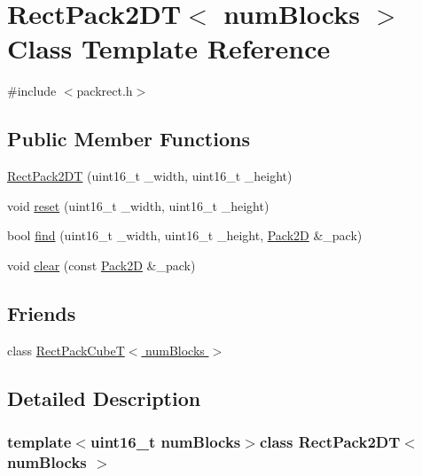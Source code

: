 \hypertarget{class_rect_pack2_d_t}{\section{Rect\+Pack2\+D\+T$<$ num\+Blocks $>$ Class Template Reference}
\label{class_rect_pack2_d_t}
}


{\ttfamily \#include $<$packrect.\+h$>$}

\subsection*{Public Member Functions}
\begin{DoxyCompactItemize}
\item 
\hyperlink{class_rect_pack2_d_t_a475fb57d65c318626bb51fbd9dcc20dc}{Rect\+Pack2\+D\+T} (uint16\+\_\+t \+\_\+width, uint16\+\_\+t \+\_\+height)
\item 
void \hyperlink{class_rect_pack2_d_t_aac0ac0b9631bcbf3f2a10e8c7cf8ab12}{reset} (uint16\+\_\+t \+\_\+width, uint16\+\_\+t \+\_\+height)
\item 
bool \hyperlink{class_rect_pack2_d_t_a47450b481e3b9fc57b978f8aba4e9dca}{find} (uint16\+\_\+t \+\_\+width, uint16\+\_\+t \+\_\+height, \hyperlink{struct_pack2_d}{Pack2\+D} \&\+\_\+pack)
\item 
void \hyperlink{class_rect_pack2_d_t_aedff115b84ad02b97c26c1ceb492886a}{clear} (const \hyperlink{struct_pack2_d}{Pack2\+D} \&\+\_\+pack)
\end{DoxyCompactItemize}
\subsection*{Friends}
\begin{DoxyCompactItemize}
\item 
class \hyperlink{class_rect_pack2_d_t_ac2d4e1c14e02415a4da39a73bbdebc69}{Rect\+Pack\+Cube\+T$<$ num\+Blocks $>$}
\end{DoxyCompactItemize}


\subsection{Detailed Description}
\subsubsection*{template$<$uint16\+\_\+t num\+Blocks$>$class Rect\+Pack2\+D\+T$<$ num\+Blocks $>$}




